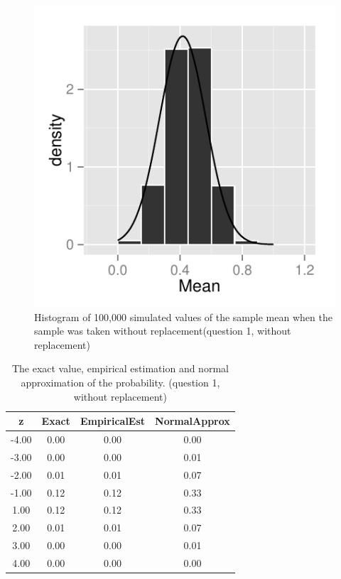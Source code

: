 \documentclass[11pt]{article}
\begin{document}
\begin{figure}
\centering
\includegraphics[scale=1]{histogram_1e-1.pdf}
\caption{Histogram of 100,000 simulated values of the sample mean when the sample was taken without replacement(question 1, without replacement)}
\end{figure}

\begin{table}[H]
\centering
\begin{tabular}{|c|ccc|}
  \hline
z & Exact & EmpiricalEst & NormalApprox \\ 
  \hline
-4.00 & 0.00 & 0.00 & 0.00 \\ 
  -3.00 & 0.00 & 0.00 & 0.01 \\ 
  -2.00 & 0.01 & 0.01 & 0.07 \\ 
  -1.00 & 0.12 & 0.12 & 0.33 \\ 
  1.00 & 0.12 & 0.12 & 0.33 \\ 
  2.00 & 0.01 & 0.01 & 0.07 \\ 
  3.00 & 0.00 & 0.00 & 0.01 \\ 
  4.00 & 0.00 & 0.00 & 0.00 \\ 
   \hline
\end{tabular}
\caption{The exact value, empirical estimation and normal approximation of the probability. (question 1, without replacement)} 
\end{table}
\end{document}
